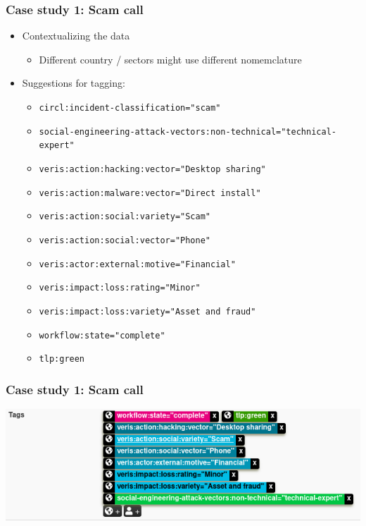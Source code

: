 \begin{frame}
    \frametitle{Case study 1: Scam call}
    \begin{itemize}
        \item Contextualizing the data
        \begin{itemize}
            \item Different country / sectors might use different nomemclature
        \end{itemize}
        \item Suggestions for tagging:
        \begin{itemize}
            \item \texttt{circl:incident-classification="scam"}
            \item \texttt{\tiny social-engineering-attack-vectors:non-technical="technical-expert"}
            \item \texttt{veris:action:hacking:vector="Desktop sharing"}
            \item \texttt{veris:action:malware:vector="Direct install"}
            \item \texttt{veris:action:social:variety="Scam"}
            \item \texttt{veris:action:social:vector="Phone"}
            \item \texttt{veris:actor:external:motive="Financial"}
            \item \texttt{veris:impact:loss:rating="Minor"}
            \item \texttt{veris:impact:loss:variety="Asset and fraud"}
            \item \texttt{workflow:state="complete"}
            \item \texttt{tlp:green}
        \end{itemize}
    \end{itemize}
\end{frame}

\begin{frame}
    \frametitle{Case study 1: Scam call}
    \includegraphics[width=1.0\linewidth]{pictures/case1/event-tags.png}
\end{frame}

